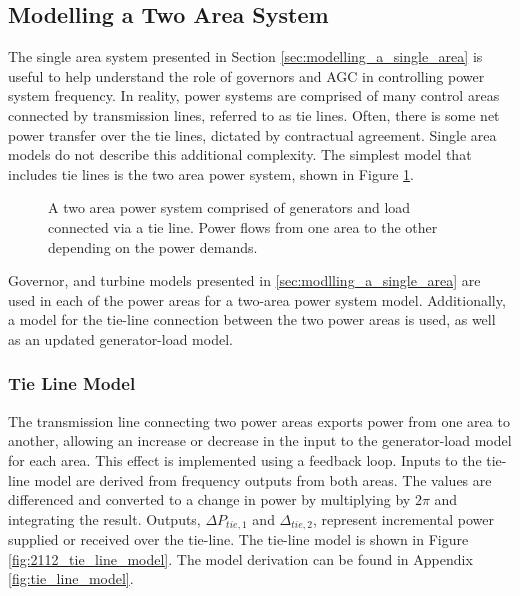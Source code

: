 \subsection{Modelling a Two Area System} \label{ssec:modelling_two_area_system}
The single area system presented in Section \ref{sec:modelling_a_single_area} is useful to help understand the role of governors and AGC in controlling power system frequency. In reality, power systems are comprised of many control areas connected by transmission lines, referred to as tie lines. Often, there is some net power transfer over the tie lines, dictated by contractual agreement. Single area models do not describe this additional complexity. The simplest model that includes tie lines is the two area power system, shown in Figure \ref{fig:2111_two_area_system}.

\begin{figure}[h]
	\centering
	\resizebox{12cm}{!}{}
	\caption[Overview of two area power system with tie line]{A two area power system comprised of generators and load connected via a tie line. Power flows from one area to the other depending on the power demands.}
	\label{fig:2111_two_area_system}
\end{figure}

Governor, and turbine models presented in \textsection \ref{sec:modlling_a_single_area} are used in each of the power areas for a two-area power system model. Additionally, a model for the tie-line connection between the two power areas is used, as well as an updated generator-load model. 

\subsubsection{Tie Line Model}\label{sec:tie_line_model}
The transmission line connecting two power areas exports power from one area to another, allowing an increase or decrease in the input to the generator-load model for each area. This effect is implemented using a feedback loop. Inputs to the tie-line model are derived from frequency outputs from both areas. The values are differenced and converted to a change in power by multiplying by $2\pi$ and integrating the result. Outputs, $\Delta P_{tie,1}$ and $\Delta_{tie,2}$, represent incremental power supplied or received over the tie-line. The tie-line model is shown in Figure \ref{fig:2112_tie_line_model}. The model derivation can be found in Appendix \ref{fig:tie_line_model}.

